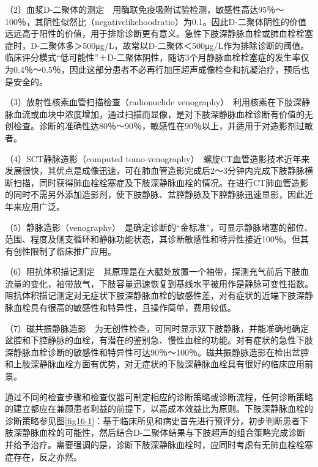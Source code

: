 （2）血浆D-二聚体的测定　用酶联免疫吸附试验检测，敏感性高达95％～100％，其阴性似然比（negativelikehoodratio）为0.1。因此D-二聚体阴性的价值远远高于阳性的价值，用于排除诊断更有意义。急性下肢深静脉血栓或肺血栓栓塞症时，D-二聚体多＞500μg/L，故常以D-二聚体＜500μg/L作为排除诊断的阈值。临床评分模式“低可能性”＋D-二聚体阴性，随访3个月静脉血栓栓塞症的发生率仅为0.4％～0.5％，因此这部分患者不必再行加压超声成像检查和抗凝治疗，预后也是安全的。

（3）放射性核素血管扫描检查（radionuclide
venography）　利用核素在下肢深静脉血流或血块中浓度增加，通过扫描而显像，是对下肢深静脉血栓诊断有价值的无创检查。诊断的准确性达80％～90％，敏感性在90％以上，并适用于对造影剂过敏者。

（4）SCT静脉造影（computed
tomo-venography）　螺旋CT血管造影技术近年来发展很快，其优点是成像迅速，可在肺血管造影完成后2～3分钟内完成下肢静脉横断扫描，同时获得肺血栓栓塞症及下肢深静脉血栓的情况。在进行CT肺血管造影的同时不需另外添加造影剂，使下肢静脉、盆腔静脉及下腔静脉迅速显影，因此近年来应用广泛。

（5）静脉造影（venography）　是确定诊断的“金标准”，可显示静脉堵塞的部位、范围、程度及侧支循环和静脉功能状态，其诊断敏感性和特异性接近100％。但其有创性限制了临床推广应用。

（6）阻抗体积描记测定　其原理是在大腿处放置一个袖带，探测充气前后下肢血流量的变化，袖带放气，下肢容量迅速恢复到基线水平被用作是静脉可变性指数。阻抗体积描记测定对无症状下肢深静脉血栓的敏感性差，对有症状的近端下肢深静脉血栓具有很高的敏感性和特异性，且操作简单，费用较低。

（7）磁共振静脉造影　为无创性检查，可同时显示双下肢静脉，并能准确地确定盆腔和下腔静脉的血栓，有潜在的鉴别急、慢性血栓的功能。对有症状的急性下肢深静脉血栓诊断的敏感性和特异性可达90％～100％。磁共振静脉造影在检出盆腔和上肢深静脉血栓方面有优势，对无症状的下肢深静脉血栓具有很好的临床应用前景。

通过不同的检查步骤和检查仪器可制定相应的诊断策略或诊断流程，任何诊断策略的建立都应在兼顾患者利益的前提下，以高成本效益比为原则。下肢深静脉血栓的诊断策略参见图\ref{fig16-1}：基于临床所见和病史首先进行预评分，初步判断患者下肢深静脉血栓的可能性，然后结合D-二聚体结果与下肢超声的组合策略完成诊断并给予治疗。需要强调的是，诊断下肢深静脉血栓时，应同时考虑有无肺血栓栓塞症存在，反之亦然。

